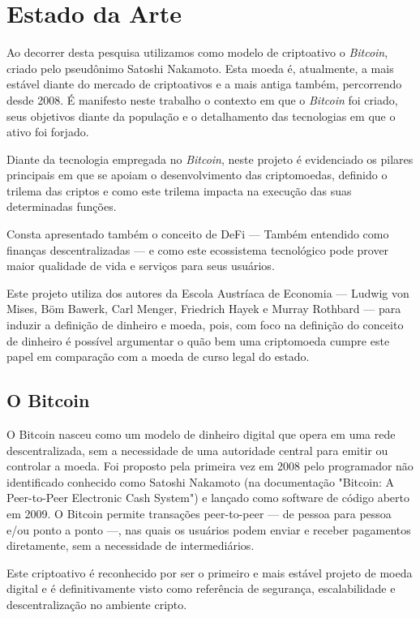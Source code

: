 \chapter{Estado da Arte}
Ao decorrer desta pesquisa utilizamos como modelo de criptoativo o \textit{Bitcoin}, criado pelo pseudônimo Satoshi Nakamoto. Esta moeda é, atualmente, a mais estável diante do mercado de criptoativos e a mais antiga também, percorrendo desde 2008. É manifesto neste trabalho o contexto em que o \textit{Bitcoin} foi criado, seus objetivos diante da população e o detalhamento das tecnologias em que o ativo foi forjado.

Diante da tecnologia empregada no \textit{Bitcoin}, neste projeto é evidenciado os pilares principais em que se apoiam o desenvolvimento das criptomoedas, definido o trilema das criptos e como este trilema impacta na execução das suas determinadas funções.

Consta apresentado também o conceito de DeFi — Também entendido como finanças descentralizadas — e como este ecossistema tecnológico pode prover maior qualidade de vida e serviços para seus usuários.

Este projeto utiliza dos autores da Escola Austríaca de Economia — Ludwig von Mises, Böm Bawerk, Carl Menger, Friedrich Hayek e Murray Rothbard — para induzir a definição de dinheiro e moeda, pois, com foco na definição do conceito de dinheiro é possível argumentar o quão bem uma criptomoeda cumpre este papel em comparação com a moeda de curso legal do estado. 

\section{O Bitcoin} \label{sec:bitcoin}
O Bitcoin nasceu como um modelo de dinheiro digital que opera em uma rede descentralizada, sem a necessidade de uma autoridade central para emitir ou controlar a moeda. Foi proposto pela primeira vez em 2008 pelo programador não identificado conhecido como Satoshi Nakamoto (na documentação "Bitcoin: A Peer-to-Peer Electronic Cash System") e lançado como software de código aberto em 2009. O Bitcoin permite transações peer-to-peer — de pessoa para pessoa e/ou ponto a ponto —, nas quais os usuários podem enviar e receber pagamentos diretamente, sem a necessidade de intermediários.

Este criptoativo é reconhecido por ser o primeiro e mais estável projeto de moeda digital e é definitivamente visto como referência de segurança, escalabilidade e descentralização no ambiente cripto.

